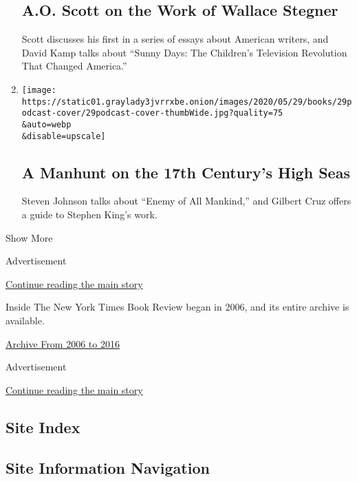 \begin{enumerate}
  \hypertarget{ao-scott-on-the-work-of-wallace-stegner}{%
  \subsection{A.O. Scott on the Work of Wallace
  Stegner}\label{ao-scott-on-the-work-of-wallace-stegner}}

  Scott discusses his first in a series of essays about American
  writers, and David Kamp talks about ``Sunny Days: The Children's
  Television Revolution That Changed America.''
\item
  \href{/2020/05/29/books/review/podcast-enemy-of-all-mankind-piracy-steven-johnson-stephen-king-gilbert-cruz.html}{}

  \texttt{[image: https://static01.graylady3jvrrxbe.onion/images/2020/05/29/books/29podcast-cover/29podcast-cover-thumbWide.jpg?quality=75\\\&auto=webp\\\&disable=upscale]}

  \hypertarget{a-manhunt-on-the-17th-centurys-high-seas}{%
  \subsection{A Manhunt on the 17th Century's High
  Seas}\label{a-manhunt-on-the-17th-centurys-high-seas}}

  Steven Johnson talks about ``Enemy of All Mankind,'' and Gilbert Cruz
  offers a guide to Stephen King's work.
\end{enumerate}

Show More

Advertisement

\protect\hyperlink{after-mid1}{Continue reading the main story}

Inside The New York Times Book Review began in 2006, and its entire
archive is available.

\href{http://www.nytimes3xbfgragh.onion/ref/books/books-podcast-archive.html}{Archive
From 2006 to 2016}

Advertisement

\protect\hyperlink{after-mktg}{Continue reading the main story}

\hypertarget{site-index}{%
\subsection{Site Index}\label{site-index}}

\hypertarget{site-information-navigation}{%
\subsection{Site Information
Navigation}\label{site-information-navigation}}

